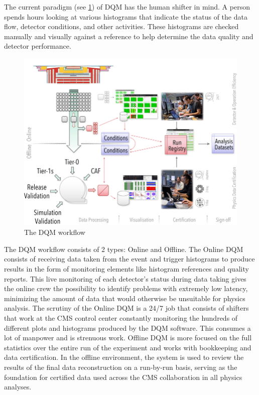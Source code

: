 The current paradigm (see \cref{fig:DQM_workflow}) of DQM has the human shifter in mind. A person spends hours looking at various histograms that indicate the status of the data flow, detector conditions, and other activities. These histograms are checked manually and visually against a reference to help determine the data quality and detector performance.
\begin{figure}
	\centering
	\includegraphics[width=.9\linewidth]{Images/DQM Workflow.png}
	\caption{The DQM workflow}
	\label{fig:DQM_workflow}
\end{figure}
The DQM workflow consists of 2 types: Online and Offline.
The Online DQM consists of receiving data taken from the event and trigger histograms to produce results in the form of monitoring elements like histogram references and quality reports. This live monitoring of each detector’s status during data taking gives the online crew the possibility to identify problems with extremely low latency, minimizing the amount of data that would otherwise be unsuitable for physics analysis. The scrutiny of the Online DQM is a 24/7 job that consists of shifters that work at the CMS control center constantly monitoring the hundreds of different plots and histograms produced by the DQM software. This consumes a lot of manpower and is strenuous work.
Offline DQM is more focused on the full statistics over the entire run of the experiment and works with bookkeeping and data certification. In the offline environment, the system is used to review the results of the final data reconstruction on a run-by-run basis, serving as the foundation for certified data used across the CMS collaboration in all physics analyses.


